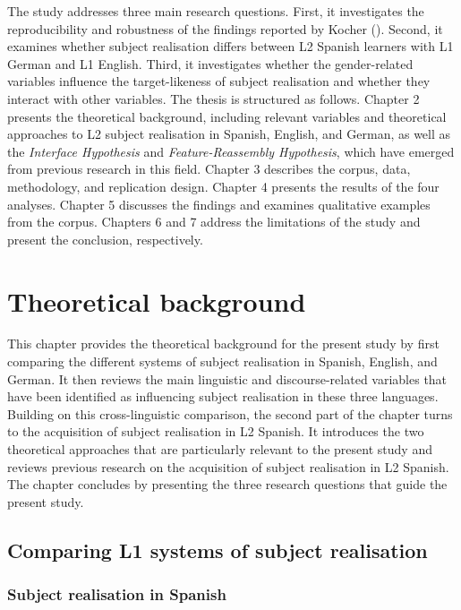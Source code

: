 \documentclass[
  letterpaper,
  DIV=11,
  numbers=noendperiod]{scrartcl}
\begin{document}
The study addresses three main research questions. First, it
investigates the reproducibility and robustness of the findings reported
by Kocher (). Second, it
examines whether subject realisation differs between L2 Spanish learners
with L1 German and L1 English. Third, it investigates whether the
gender-related variables influence the target-likeness of subject
realisation and whether they interact with other variables. The thesis
is structured as follows. Chapter 2 presents the theoretical background,
including relevant variables and theoretical approaches to L2 subject
realisation in Spanish, English, and German, as well as the
\emph{Interface Hypothesis} and \emph{Feature-Reassembly Hypothesis},
which have emerged from previous research in this field. Chapter 3
describes the corpus, data, methodology, and replication design. Chapter
4 presents the results of the four analyses. Chapter 5 discusses the
findings and examines qualitative examples from the corpus. Chapters 6
and 7 address the limitations of the study and present the conclusion,
respectively.

\section{Theoretical background}\label{sec-Background}

This chapter provides the theoretical background for the present study
by first comparing the different systems of subject realisation in
Spanish, English, and German. It then reviews the main linguistic and
discourse-related variables that have been identified as influencing
subject realisation in these three languages. Building on this
cross-linguistic comparison, the second part of the chapter turns to the
acquisition of subject realisation in L2 Spanish. It introduces the two
theoretical approaches that are particularly relevant to the present
study and reviews previous research on the acquisition of subject
realisation in L2 Spanish. The chapter concludes by presenting the three
research questions that guide the present study.

\subsection{Comparing L1 systems of subject
realisation}\label{sec-SubjectRealisationEsp}

\subsubsection{Subject realisation in
Spanish}\label{subject-realisation-in-spanish}
\end{document}
